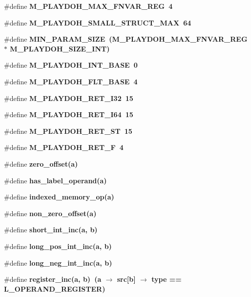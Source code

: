 \begin{CompactItemize}
\#define \bf{M\_\-PLAYDOH\_\-MAX\_\-FNVAR\_\-REG}~4
\item 
\#define \bf{M\_\-PLAYDOH\_\-SMALL\_\-STRUCT\_\-MAX}~64
\item 
\#define \bf{MIN\_\-PARAM\_\-SIZE}~(M\_\-PLAYDOH\_\-MAX\_\-FNVAR\_\-REG $\ast$ M\_\-PLAYDOH\_\-SIZE\_\-INT)
\item 
\#define \bf{M\_\-PLAYDOH\_\-INT\_\-BASE}~0
\item 
\#define \bf{M\_\-PLAYDOH\_\-FLT\_\-BASE}~4
\item 
\#define \bf{M\_\-PLAYDOH\_\-RET\_\-I32}~15
\item 
\#define \bf{M\_\-PLAYDOH\_\-RET\_\-I64}~15
\item 
\#define \bf{M\_\-PLAYDOH\_\-RET\_\-ST}~15
\item 
\#define \bf{M\_\-PLAYDOH\_\-RET\_\-F}~4
\item 
\#define \bf{zero\_\-offset}(a)
\item 
\#define \bf{has\_\-label\_\-operand}(a)
\item 
\#define \bf{indexed\_\-memory\_\-op}(a)
\item 
\#define \bf{non\_\-zero\_\-offset}(a)
\item 
\#define \bf{short\_\-int\_\-inc}(a, b)
\item 
\#define \bf{long\_\-pos\_\-int\_\-inc}(a, b)
\item 
\#define \bf{long\_\-neg\_\-int\_\-inc}(a, b)
\item 
\#define \bf{register\_\-inc}(a, b)~(a $\rightarrow$ src[b] $\rightarrow$ type == L\_\-OPERAND\_\-REGISTER)
\end{CompactItemize}
